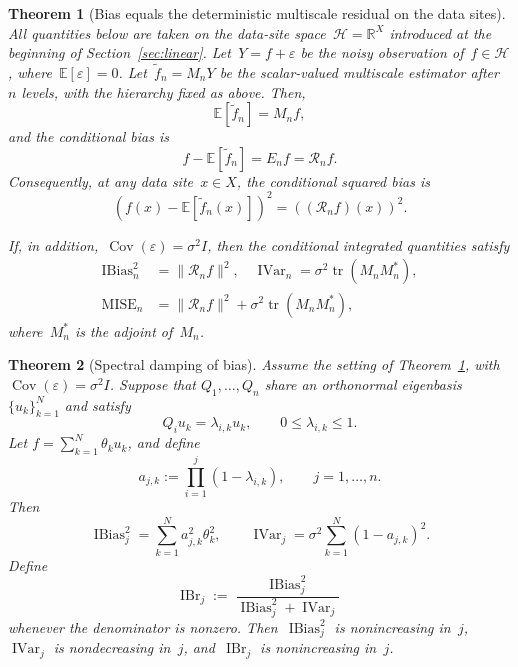\documentclass[10pt,a4paper]{amsart}
\newtheorem{theorem}{Theorem}
\newcommand{\E}{{\mathbb{E}}}
\newcommand{\R}{\mathbb{R}}
\newcommand{\ibias}{\operatorname{IBias}^2}
\DeclareMathOperator{\ibr}{IBr}
\DeclareMathOperator{\ivar}{IVar}
\DeclareMathOperator{\mise}{MISE}
\begin{document}
\begin{theorem}[Bias equals the deterministic multiscale residual on the data sites]\label{thm:bias-equals-residual}
All quantities below are taken on the data-site space~$\mathcal H=\R^{X}$ introduced at the beginning of Section~\ref{sec:linear}. Let~$Y=f+\varepsilon$ be the noisy observation of~$f\in\mathcal H$, where~$\E[\varepsilon]=0$. Let~$\widetilde f_n=M_nY$ be the scalar-valued multiscale estimator after~$n$ levels, with the hierarchy fixed as above. Then,
\begin{equation}\label{eq:expected-multiscale-estimator}
    \E[\widetilde f_n]=M_nf,
\end{equation}
and the conditional bias is
\begin{equation}\label{eq:bias-residual-identity}
    f-\E[\widetilde f_n]=E_nf=\mathcal R_nf.
\end{equation}
Consequently, at any data site~$x \in X$, the conditional squared bias is
\begin{equation}\label{eq:pointwise-bias-residual}
   \left(f(x)-\E[\widetilde f_n(x)]\right)^2=\left((\mathcal R_nf)(x)\right)^2.
\end{equation}

If, in addition,~$\operatorname{Cov}(\varepsilon)=\sigma^2 I$, then the conditional integrated quantities satisfy
\begin{equation}\label{eq:integrated-bias--variance-residual}
\begin{split}  
    \ibias_n &= \|\mathcal R_nf\|^2,
    \quad
    \ivar_n = \sigma^2\operatorname{tr}(M_nM_n^*),
     \\
    \mise_n &= \|\mathcal R_nf\|^2+\sigma^2\operatorname{tr}(M_nM_n^*),
    \end{split}
\end{equation}
where~$M_n^*$ is the adjoint of~$M_n$.
\end{theorem}

\begin{theorem}[Spectral damping of bias]
\label{thm:spectral-damping}
Assume the setting of Theorem~\ref{thm:bias-equals-residual}, with \(\operatorname{Cov}(\varepsilon)=\sigma^2 I\). Suppose that \(Q_1,\ldots,Q_n\) share an orthonormal eigenbasis \(\{u_k\}_{k=1}^N\) and satisfy
\[
    Q_i u_k=\lambda_{i,k}u_k,
    \qquad
    0\leq \lambda_{i,k}\leq 1 .
\]
Let \(f=\sum_{k=1}^N\theta_k u_k\), and define
\[
    a_{j,k}:=\prod_{i=1}^j(1-\lambda_{i,k}),
    \qquad j=1,\ldots,n .
\]
Then
\[
    \ibias_j
    =
    \sum_{k=1}^N a_{j,k}^2\theta_k^2,
    \qquad
    \ivar_j
    =
    \sigma^2\sum_{k=1}^N(1-a_{j,k})^2 .
\]
Define
\[
    \ibr_j:=\frac{\ibias_j}{\ibias_j+\ivar_j}
\]
whenever the denominator is nonzero. Then~\(\ibias_j\) is nonincreasing in~\(j\), \(\ivar_j\) is nondecreasing in~\(j\), and~\(\ibr_j\) is nonincreasing in~\(j\).
\end{theorem}
\end{document}
